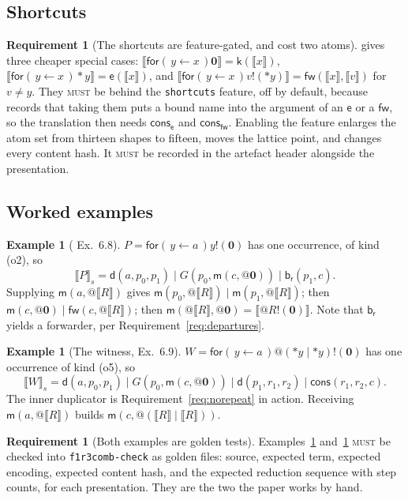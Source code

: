 \documentclass[11pt,a4paper]{article}
\makeatletter
\newcommand{\code}[1]{\texttt{#1}}
\newcommand{\MUST}{\textsc{must}}
\newcommand{\quo}[1]{@#1}
\newcommand{\drp}[1]{{*}#1}
\newcommand{\inp}[3]{\mathsf{for}(\,#1 \leftarrow #2\,)#3}
\newcommand{\out}[2]{#1!(#2)}
\newcommand{\nil}{\mathbf{0}}
\newcommand{\enc}[1]{\llbracket #1 \rrbracket}
\newcommand{\mm}{\mathsf{m}}
\newcommand{\dd}{\mathsf{d}}
\newcommand{\kk}{\mathsf{k}}
\newcommand{\fw}{\mathsf{fw}}
\newcommand{\br}{\mathsf{b}_{\mathsf{r}}}
\newcommand{\ev}{\mathsf{e}}
\newcommand{\cons}{\mathsf{cons}}
\theoremstyle{definition}
\newtheorem{requirement}[definition]{Requirement}
\newtheorem{example}[definition]{Example}
\theoremstyle{plain}
\makeatother
\begin{document}
\subsection{Shortcuts}

\begin{requirement}[The shortcuts are feature-gated, and cost two atoms]
\label{req:shortcuts}
\cite[Rem.~6.7]{draft3} gives three cheaper special cases:
$\enc{\inp{y}{x}{\nil}} = \kk(\enc{x})$,
$\enc{\inp{y}{x}{\drp{y}}} = \ev(\enc{x})$, and
$\enc{\inp{y}{x}{\out{v}{\drp{y}}}} = \fw(\enc{x},\enc{v})$ for $v \neq y$.
They \MUST{} be behind the \code{shortcuts} feature, off by default, because
\cite[Rem.~3.10]{draft3} records that taking them puts a bound name into the
argument of an $\ev$ or a $\fw$, so the translation then needs $\cons_{\ev}$
and $\cons_{\fw}$. Enabling the feature enlarges the atom set from thirteen
shapes to fifteen, moves the lattice point, and changes every content hash. It
\MUST{} be recorded in the artefact header alongside the presentation.
\end{requirement}

\subsection{Worked examples}

\begin{example}[\cite{draft3} Ex.~6.8]\label{ex:o2}
$P = \inp{y}{a}{\out{y}{\nil}}$ has one occurrence, of kind (o2), so
\[
  \enc{P}_{s} = \dd(a,p_{0},p_{1}) \mid G(p_{0},\mm(c,\quo{\nil})) \mid
  \br(p_{1},c).
\]
Supplying $\mm(a,\quo{\enc{R}})$ gives $\mm(p_{0},\quo{\enc{R}}) \mid
\mm(p_{1},\quo{\enc{R}})$; then $\mm(c,\quo{\nil}) \mid \fw(c,\quo{\enc{R}})$;
then $\mm(\quo{\enc{R}},\quo{\nil}) = \enc{\out{\quo{R}}{\nil}}$. Note that
$\br$ yields a forwarder, per Requirement~\ref{req:departures}.
\end{example}

\begin{example}[The witness, \cite{draft3} Ex.~6.9]\label{ex:witness}
$W = \inp{y}{a}{\out{\quo{(\drp{y} \mid \drp{y})}}{\nil}}$ has one occurrence
of kind (o5), so
\[
  \enc{W}_{s} = \dd(a,p_{0},p_{1}) \mid G(p_{0},\mm(c,\quo{\nil}))
  \mid \dd(p_{1},r_{1},r_{2}) \mid \cons(r_{1},r_{2},c).
\]
The inner duplicator is Requirement~\ref{req:norepeat} in action. Receiving
$\mm(a,\quo{\enc{R}})$ builds $\mm(c,\quo{(\enc{R}\mid\enc{R})})$.
\end{example}

\begin{requirement}[Both examples are golden tests]\label{req:golden}
Examples~\ref{ex:o2} and~\ref{ex:witness} \MUST{} be checked into
\code{f1r3comb-check} as golden files: source, expected term, expected
encoding, expected content hash, and the expected reduction sequence with step
counts, for each presentation. They are the two the paper works by hand.
\end{requirement}
\end{document}
